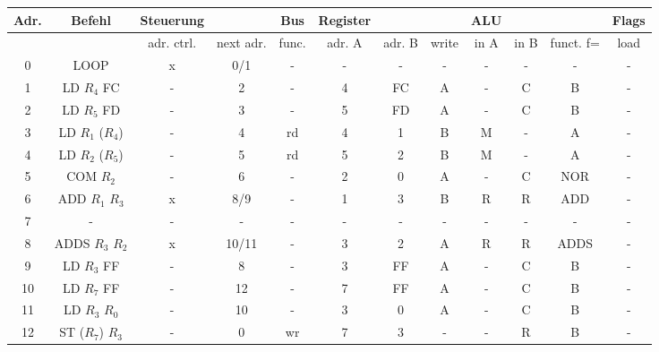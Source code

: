 \documentclass[paper=a4, fontsize=11pt]{scrartcl}
\numberwithin{equation}{section}
\numberwithin{figure}{section}
\numberwithin{table}{section}
\begin{document}
\begin{tabular}{|c|c|cc|c|ccc|ccc|c|}
\hline
Adr. & Befehl &Steuerung & & Bus & Register & & & ALU & & & Flags \\
\hline
& & adr. ctrl. & next adr. & func. & adr. A & adr. B & write & in A & in B & funct. f= & load \\
\hline
0 & LOOP & x & 0/1 & - & - & - & - & - & - & - & - \\
\hline
1 & LD $R_{4}$ FC & - & 2 & - & 4 & FC & A & - & C & B & - \\
\hline
2 & LD $R_{5}$ FD & - & 3 & - & 5 & FD & A & - & C & B & - \\
\hline
3 & LD $R_{1}$ ($R_{4}$) & - & 4 & rd & 4 & 1 & B & M & - & A & - \\
\hline
4 & LD $R_{2}$ ($R_{5}$) & - & 5 & rd & 5 & 2 & B & M & - & A & - \\
\hline
5 & COM $R_{2}$ & - & 6 & - & 2 & 0 & A & - & C & NOR & - \\
\hline
6 & ADD $R_{1}$ $R_{3}$ & x & 8/9 & - & 1 & 3 & B & R & R & ADD & - \\
\hline
7 & - & - & - & - & - & - & - & - & - & - & - \\
\hline
8 & ADDS $R_{3}$ $R_{2}$ & x & 10/11 & - & 3 & 2 & A & R & R & ADDS & - \\
\hline
9 & LD $R_{3}$ FF & - & 8 & - & 3 & FF & A & - & C & B & - \\
\hline
10 & LD $R_{7}$ FF & - & 12 & - & 7 & FF & A & - & C & B & - \\
\hline
11 & LD $R_{3}$ $R_{0}$ & - & 10 & - & 3 & 0 & A & - & C & B &  -\\
\hline
12 & ST ($R_{7}$) $R_{3}$ & - & 0 & wr & 7 & 3 & - & - & R & B & - \\
\hline
\end{tabular} \\
\end{document}
